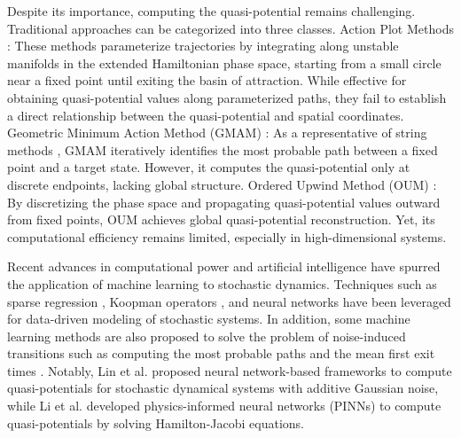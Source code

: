 \documentclass[11pt]{article}
\theoremstyle{plain}      %
\theoremstyle{definition} %
\begin{document}
Despite its importance, computing the quasi-potential remains challenging. Traditional approaches can be categorized into three classes. Action Plot Methods \cite{beri2005solution}: These methods parameterize trajectories by integrating along unstable manifolds in the extended Hamiltonian phase space, starting from a small circle near a fixed point until exiting the basin of attraction. While effective for obtaining quasi-potential values along parameterized paths, they fail to establish a direct relationship between the quasi-potential and spatial coordinates. Geometric Minimum Action Method (GMAM) \cite{heymann2008geometric}: As a representative of string methods \cite{grafke2019numerical, zhou2008adaptive, cameron2011string, weinan2004minimum}, GMAM iteratively identifies the most probable path between a fixed point and a target state. However, it computes the quasi-potential only at discrete endpoints, lacking global structure. Ordered Upwind Method (OUM) \cite{cameron2012finding, dahiya2018ordered}: By discretizing the phase space and propagating quasi-potential values outward from fixed points, OUM achieves global quasi-potential reconstruction. Yet, its computational efficiency remains limited, especially in high-dimensional systems.

Recent advances in computational power and artificial intelligence have spurred the application of machine learning to stochastic dynamics. Techniques such as sparse regression \cite{Boninsegna2018, YangLi2020a}, Koopman operators \cite{EDMD, SKO3}, and neural networks \cite{XiaoliChen} have been leveraged for data-driven modeling of stochastic systems. In addition, some machine learning methods are also proposed to solve the problem of noise-induced transitions such as computing the most probable paths \cite{li2021machine, wei2022optimal} and the mean first exit times \cite{li2024deep}. Notably, Lin et al. \cite{lin2022data} proposed neural network-based frameworks to compute quasi-potentials for stochastic dynamical systems with additive Gaussian noise, while Li et al. \cite{li2022machine} developed physics-informed neural networks (PINNs) to compute quasi-potentials by solving Hamilton-Jacobi equations.
\end{document}
